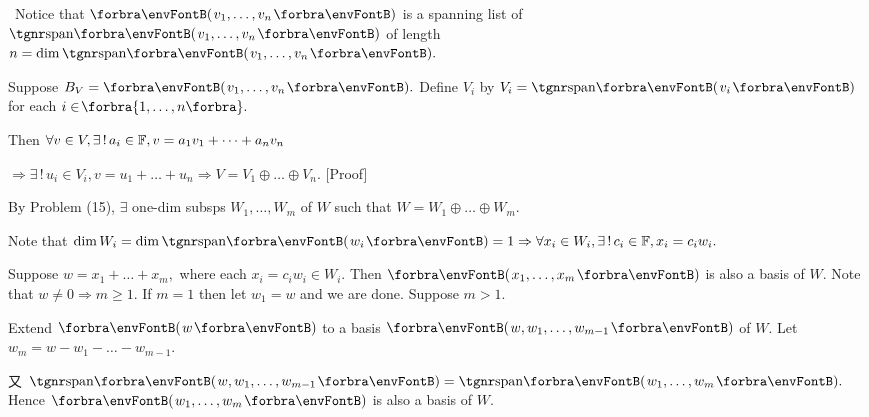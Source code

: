 \documentclass[a4paper, 11pt, UTF8]{article}
\begin{document}
\begin{large}
\BulletPoint \,\hspace{1pt}{\Tips\TextB{}}
Notice that $\Par{v_1,\dots,v_n}$ is a spanning list of $\Span{v_1,\dots,v_n}$ of length $n=\dim\Span{v_1,\dots,v_n}.$\PfEnd
\SepLine

\par\quad
Suppose $B_V=\Par{v_1,\dots,v_n}.$ Define $V_i$ by $V_i=\Span{v_i}$ for each $i\in\!\Bra{1,\dots,n}.$\par\quad
Then $\forall v\in V,\exists\,!\,a_i\in{\mathbb{F}},v=a_1 v_1+\dots+a_n v_n$\par\quad
{}$\Rightarrow\exists\,!\,u_i\in V_i,v=u_1+\dots+u_n\Rightarrow V=V_1\oplus\dots\oplus V_n.$\PfEnd
{}[Proof]\par\quad
By Problem (15), $\exists$ one-dim subsps $W_1,\dots,W_m$ of $W$ such that $W=W_1\oplus\dots\oplus W_m.$\par\quad
Note that $\dim W_i=\dim\Span{w_i}=1\Rightarrow\forall x_i\in W_i,\exists\,!\,c_i\in\Fbb,x_i=c_i w_i.$\par\quad
Suppose $w=x_1+\dots+x_m,$ where each $x_i=c_i w_i\in W_i.$ Then $\Par{x_1,\dots,x_m}$ is also a basis of $W.$\PfEnd\vspace{6pt}\quad
\Or Note that $w\neq 0\Rightarrow m\geqslant 1.$ If $m=1$ then let $w_1=w$ and we are done. Suppose $m>1.$\par\quad
Extend $\Par{w}$ to a basis $\Par{w,w_1,\dots,w_{m-1}}$ of $W.$ Let $w_m=w-w_1-\dots-w_{m-1}.$\par\quad
又 $\Span{w,w_1,\dots,w_{m-1}}=\Span{w_1,\dots,w_m}.$ Hence $\Par{w_1,\dots,w_m}$ is also a basis of $W.$\PfEnd
\SepLine


\end{large}
\end{document}
